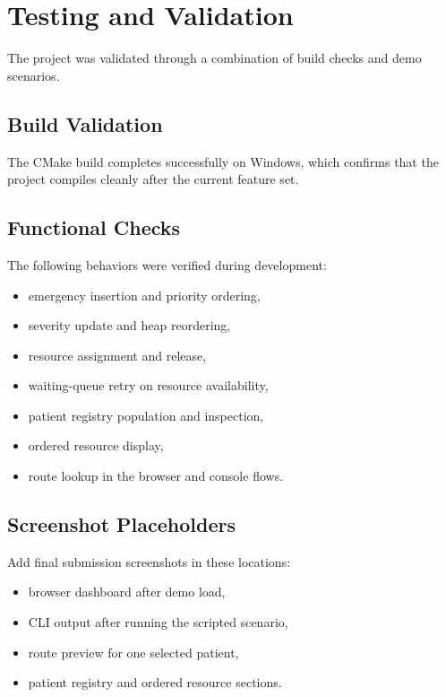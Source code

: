 \documentclass[12pt,a4paper]{report}
\begin{document}
\chapter{Testing and Validation}
The project was validated through a combination of build checks and demo scenarios.

\section{Build Validation}
The CMake build completes successfully on Windows, which confirms that the project compiles cleanly after the current feature set.

\section{Functional Checks}
The following behaviors were verified during development:
\begin{itemize}[leftmargin=1.2cm]
  \item emergency insertion and priority ordering,
  \item severity update and heap reordering,
  \item resource assignment and release,
  \item waiting-queue retry on resource availability,
  \item patient registry population and inspection,
  \item ordered resource display,
  \item route lookup in the browser and console flows.
\end{itemize}

\section{Screenshot Placeholders}
Add final submission screenshots in these locations:
\begin{itemize}[leftmargin=1.2cm]
  \item browser dashboard after demo load,
  \item CLI output after running the scripted scenario,
  \item route preview for one selected patient,
  \item patient registry and ordered resource sections.
\end{itemize}
\end{document}
